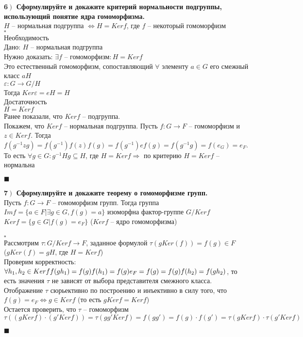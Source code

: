 \documentclass[a4paper,12pt]{article}
\begin{document}
    \textbf{6$\left.\right)$ Сформулируйте и докажите критерий нормальности подгруппы, использующий понятие ядра гомоморфизма.}\\$H$ -- нормальная подгруппа $\Leftrightarrow H=Ker f$, где $f$ -- некоторый гомоморфизм\\
    $\square$\\
    Необходимость\\
    Дано: $H$ -- нормальная подгруппа\\
    Нужно доказать: $\exists f$ -- гомоморфизм$: H=Ker f$\\
    Это естественный гомоморфизм, сопоставляющий $\forall$ элементу $a\in G$ его смежный класс $aH$\\
    $\varepsilon:G\rightarrow G/H$\\
    Тогда $Ker \varepsilon=eH=H$\\
    Достаточность\\
    $H=Ker f$\\
    Ранее показали, что $Ker f$ -- подгруппа.\\
    Покажем, что $Ker f$ -- нормальная подгруппа. Пусть $f:G\rightarrow F$ -- гомоморфизм и $z\in Ker f$. Тогда $f(g^{-1}zg)=f(g^{-1})f(z)f(g)=f(g^{-1})ef(g)=f(g^{-1}g)=f(e_G)=e_F$. То есть $\forall g\in G: g^{-1}Hg\subseteq H$, где $H=Ker f\Rightarrow$ по критерию $H=Ker f$ -- нормальна
    \begin{flushright}
        $\blacksquare$
    \end{flushright}

    \textbf{7$\left.\right)$ Сформулируйте и докажите теорему о гомоморфизме групп.}\\Пусть $f:G\rightarrow F$ -- гомоморфизм групп. Тогда группа $Im f =\{a\in F|\exists g\in G, f(g)=a \}$ изоморфна фактор-группе $G/Ker f$\\
    $Ker f=\{g\in G|f(g)=e_F \}$ ($Ker f$ -- ядро гомоморфизма)\\
    \\
    $\square$\\
    Рассмотрим $\tau : G/Ker f\rightarrow F$, заданное формулой $\tau(g Ker(f))=f(g)\in F$\\ ($g Ker(f) = gH$, где $H=Ker f$)\\
    Проверим корректность:\\
    $\forall h_1, h_2\in Ker f\\
    f(gh_1)=f(g)f(h_1)=f(g)e_F=f(g)=f(g)f(h_2)=f(gh_2)$, то есть значения $\tau$ не зависят от выбора представителя смежного класса.\\
    Отображение $\tau$ сюрьективно по построению и инъективно в силу того, что\\ $f(g)=e_F\Leftrightarrow g\in Ker f$ (то есть $g Ker f=Ker f$)\\
    Остается проверить, что $\tau$ -- гомоморфизм\\
    $\tau((g Ker f)\cdot(g' Ker f))=\tau(gg' Ker f)=f(gg')=f(g)\cdot f(g')=\tau(g Ker f)\cdot\tau(g' Ker f)$
    \begin{flushright}
        $\blacksquare$
    \end{flushright}
\end{document}
